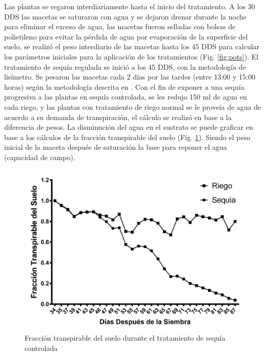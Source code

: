 \documentclass[fleqn,10pt]{Flavio}\usepackage[]{graphicx}\usepackage[]{color}
\begin{document}
Las plantas se regaron interdiariamente hasta el inicio del tratamiento. A los 30 DDS las macetas se saturaron con agua y se dejaron drenar durante la noche para eliminar el exceso de agua, las macetas fueron selladas con bolsas de polietileno para evitar la p\'erdida de agua por evaporaci\'on de la superficie del suelo, se realiz\'o el peso interdiario de las macetas hasta los 45 DDS para calcular los par\'ametros iniciales para la aplicaci\'on de los tratamientos (Fig. \ref{fig:pots}). El tratamiento de sequ\'ia regulada se inici\'o a los 45 DDS, con la metodolog\'ia de lis\'imetro. Se pesaron las macetas cada 2 d\'ias por las tardes (entre 13:00 y 15:00 horas) seg\'un la metodolog\'ia descrita en \citet{Bhatnagar-Mathur2007}. Con el fin de exponer a una sequ\'ia progresiva a las plantas en sequ\'ia controlada, se les redujo 150 ml de agua en cada riego, y las plantas con tratamiento de riego normal se le prove\'ia de agua de acuerdo a su demanda de transpiraci\'on, el c\'alculo se realiz\'o en base a la diferencia de pesos. La disminuci\'on del agua en el sustrato se puede graficar en base a los c\'alculos de la fracci\'on transpirable del suelo (Fig. \ref{fig:FTS}). Siendo el peso inicial de la maceta despu\'es de saturaci\'on la base para reponer el agua (capacidad de campo).

\begin{figure}[ht]\centering
\includegraphics[width=\linewidth]{FTS}
\caption{Fracci\'on transpirable del suelo durante el tratamiento de sequ\'ia controlada}
\label{fig:FTS}
\end{figure}
\end{document}
